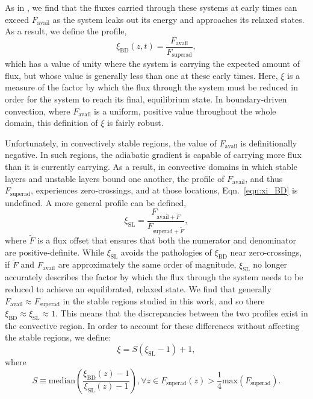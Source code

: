 As in \cite{anders&all2018}, we find that the fluxes carried through these systems at early times can exceed $F_{\text{avail}}$ as the system leaks out its energy and approaches its relaxed states.
As a result, we define the profile,
\begin{equation}
\xi_{\text{BD}}(z, t) = \frac{F_{\text{avail}}}{F_{\text{superad}}},
\label{eqn:xi_BD}
\end{equation}
which has a value of unity where the system is carrying the expected amount of flux, but whose value is generally less than one at these early times.
Here, $\xi$ is a measure of the factor by which the flux through the system must be reduced in order for the system to reach its final, equilibrium state.
In boundary-driven convection, where $F_{\text{avail}}$ is a uniform, positive value throughout the whole domain, this definition of $\xi$ is fairly robust.

Unfortunately, in convectively stable regions, the value of $F_{\text{avail}}$ is definitionally negative.
In such regions, the adiabatic gradient is capable of carrying more flux than it is currently carrying.
As a result, in convective domains in which stable layers and unstable layers bound one another, the profile of $F_{\text{avail}}$, and thus $F_{\text{superad}}$, experiences zero-crossings, and at those locations, Eqn.~\ref{eqn:xi_BD} is undefined.
A more general profile can be defined,
\begin{equation}
\xi_{\text{SL}} = \frac{F_{\text{avail} + \tilde{F}}}{F_{\text{superad} + \tilde{F}}},
\end{equation}
where $\tilde{F}$ is a flux offset that ensures that both the numerator and denominator are positive-definite.
While $\xi_{\text{SL}}$ avoids the pathologies of $\xi_{\text{BD}}$ near zero-crossings, if $\tilde{F}$ and $F_{\text{avail}}$ are approximately the same order of magnitude, $\xi_{\text{SL}}$ no longer accurately describes the factor by which the flux through the system needs to be reduced to achieve an equilibrated, relaxed state.
We find that generally $F_{\text{avail}} \approx F_{\text{superad}}$ in the stable regions studied in this work, and so there $\xi_{\text{BD}} \approx \xi_{\text{SL}} \approx 1$.
This means that the discrepancies between the two profiles exist in the convective region.
In order to account for these differences without affecting the stable regions, we define:
\begin{equation}
\xi = S (\xi_{\text{SL}} - 1) + 1,
\label{eqn:xi_stable}
\end{equation}
where 
$$
S \equiv \text{median}\left(\frac{\xi_{\text{BD}}(z) - 1}{\xi_{\text{SL}}(z) - 1}\right), \forall z \in F_{\text{superad}}(z) > \frac{1}{4}\text{max}(F_{\text{superad}}).
$$

